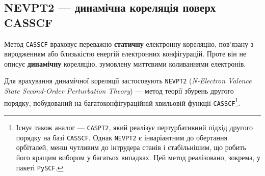 %
%
%
%

\subsection{NEVPT2 --- динамічна кореляція поверх CASSCF}

Метод \texttt{CASSCF} враховує переважно \textbf{статичну} електронну кореляцію,
пов’язану з виродженням або близькістю енергій електронних конфігурацій.
Проте він не описує \textbf{динамічну} кореляцію, зумовлену миттєвими коливаннями електронів.

Для врахування динамічної кореляції застосовують \texttt{NEVPT2}
(\emph{N-Electron Valence State Second-Order Perturbation Theory}) ---
метод теорії збурень другого порядку, побудований на багатоконфігураційній
хвильовій функції \texttt{CASSCF}\footnote{Існує також аналог --- \texttt{CASPT2},
який реалізує пертурбативний підхід другого порядку на базі \texttt{CASSCF}.
Однак \texttt{NEVPT2} є інваріантним до обертання орбіталей, менш чутливим до
інтрудера станів і стабільнішим, що робить його кращим вибором у багатьох випадках.
Цей метод реалізовано, зокрема, у пакеті \texttt{PySCF}.}.

